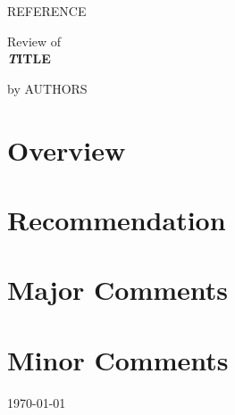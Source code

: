 \documentclass[a4paper,9pt]{scrartcl}
\newcommand\papertitle{TITLE}
\newcommand\paperauthors{AUTHORS}
\newcommand\papernr{REFERENCE}
\begin{document}
{\noindent\papernr}
\vspace*{1cm}

\noindent Review of\vspace*{0.2cm}
{\Large\\{\textbf{\textit\papertitle}}}\vspace*{0.2cm}

\noindent by \paperauthors
\vspace*{1cm}

\section{Overview}

\section{Recommendation}

\section{Major Comments}

\section{Minor Comments}

\flushright\today
\end{document}
